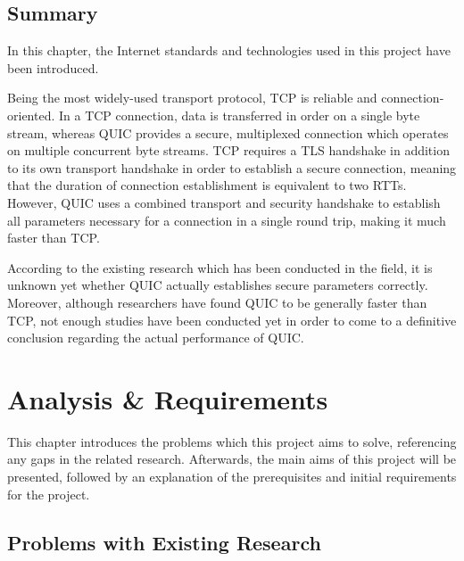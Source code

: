 \documentclass{l4proj}
\begin{document}
\section{Summary}

In this chapter, the Internet standards and technologies used in this project have been introduced. 

Being the most widely-used transport protocol, TCP is reliable and connection-oriented. In a TCP connection, data is transferred in order on a single byte stream, whereas QUIC provides a secure, multiplexed connection which operates on multiple concurrent byte streams. TCP requires a TLS handshake in addition to its own transport handshake in order to establish a secure connection, meaning that the duration of connection establishment is equivalent to two RTTs. However, QUIC uses a combined transport and security handshake to establish all parameters necessary for a connection in a single round trip, making it much faster than TCP. 

According to the existing research which has been conducted in the field, it is unknown yet whether QUIC actually establishes secure parameters correctly. Moreover, although researchers have found QUIC to be generally faster than TCP, not enough studies have been conducted yet in order to come to a definitive conclusion regarding the actual performance of QUIC.


\chapter{Analysis \& Requirements}

This chapter introduces the problems which this project aims to solve, referencing any gaps in the related research. Afterwards, the main aims of this project will be presented, followed by an explanation of the prerequisites and initial requirements for the project. 

\section{Problems with Existing Research}
\end{document}
